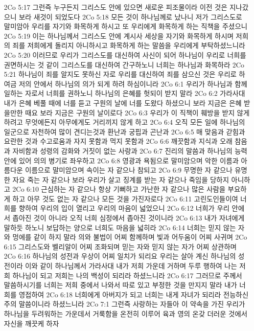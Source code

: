 2Co 5:17  그런즉 누구든지 그리스도 안에 있으면 새로운 피조물이라 이전 것은 지나갔으니 보라 새것이 되었도다
2Co 5:18  모든 것이 하나님께로 났나니 저가 그리스도로 말미암아 우리를 자기와 화목하게 하시고 또 우리에게 화목하게 하는 직책을 주셨으니
2Co 5:19  이는 하나님께서 그리스도 안에 계시사 세상을 자기와 화목하게 하시며 저희의 죄를 저희에게 돌리지 아니하시고 화목하게 하는 말씀을 우리에게 부탁하셨느니라
2Co 5:20  이러므로 우리가 그리스도를 대신하여 사신이 되어 하나님이 우리로 너희를 권면하시는 것 같이 그리스도를 대신하여 간구하노니 너희는 하나님과 화목하라
2Co 5:21  하나님이 죄를 알지도 못하신 자로 우리를 대신하여 죄를 삼으신 것은 우리로 하여금 저의 안에서 하나님의 의가 되게 하려 하심이니라
2Co 6:1  우리가 하나님과 함께 일하는 자로서 너희를 권하노니 하나님의 은혜를 헛되이 받지 말라
2Co 6:2  가라사대 내가 은혜 베풀 때에 너를 듣고 구원의 날에 너를 도왔다 하셨으니 보라 지금은 은혜 받을만한 때요 보라 지금은 구원의 날이로다
2Co 6:3  우리가 이 직책이 훼방을 받지 않게 하려고 무엇에든지 아무에게도 거리끼지 않게 하고
2Co 6:4  오직 모든 일에 하나님의 일군으로 자천하여 많이 견디는것과 환난과 궁핍과 곤난과
2Co 6:5  매 맞음과 갇힘과 요란한 것과 수고로움과 자지 못함과 먹지 못함과
2Co 6:6  깨끗함과 지식과 오래 참음과 자비함과 성령의 감화와 거짓이 없는 사랑과
2Co 6:7  진리의 말씀과 하나님의 능력 안에 있어 의의 병기로 좌우하고
2Co 6:8  영광과 욕됨으로 말미암으며 악한 이름과 아름다운 이름으로 말미암으며 속이는 자 같으나 참되고
2Co 6:9  무명한 자 같으나 유명한 자요 죽는 자 같으나 보라 우리가 살고 징계를 받는 자 같으나 죽임을 당하지 아니하고
2Co 6:10  근심하는 자 같으나 항상 기뻐하고 가난한 자 같으나 많은 사람을 부요하게 하고 아무 것도 없는 자 같으나 모든 것을 가진자로다
2Co 6:11  고린도인들이여 너희를 향하여 우리의 입이 열리고 우리의 마음이 넓었으니
2Co 6:12  너희가 우리 안에서 좁아진 것이 아니라 오직 너희 심정에서 좁아진 것이니라
2Co 6:13  내가 자녀에게 말하듯 하노니 보답하는 양으로 너희도 마음을 넓히라
2Co 6:14  너희는 믿지 않는 자와 멍에를 같이 하지 말라 의와 불법이 어찌 함께하며 빛과 어두움이 어찌 사귀며
2Co 6:15  그리스도와 벨리알이 어찌 조화되며 믿는 자와 믿지 않는 자가 어찌 상관하며
2Co 6:16  하나님의 성전과 우상이 어찌 일치가 되리요 우리는 살아 계신 하나님의 성전이라 이와 같이 하나님께서 가라사대 내가 저희 가운데 거하며 두루 행하여 나는 저희 하나님이 되고 저희는 나의 백성이 되리라 하셨느니라
2Co 6:17  그러므로 주께서 말씀하시기를 너희는 저희 중에서 나와서 따로 있고 부정한 것을 만지지 말라 내가 너희를 영접하여
2Co 6:18  너희에게 아버지가 되고 너희는 내게 자녀가 되리라 전능하신 주의 말씀이니라 하셨느니라
2Co 7:1  그런즉 사랑하는 자들아 이 약속을 가진 우리가 하나님을 두려워하는 가운데서 거룩함을 온전히 이루어 육과 영의 온갖 더러운 것에서 자신을 깨끗케 하자
